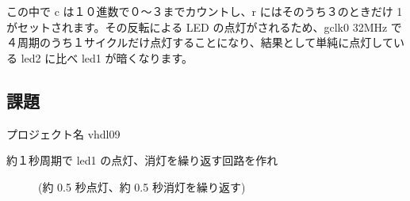 \documentclass[letterpaper,10pt,dvipdfmx]{sphinxmanual}
\begin{document}
この中で c は１０進数で０～３までカウントし、r にはそのうち３のときだけ \textquotesingle{}1\textquotesingle{} がセットされます。その反転による LED の点灯がされるため、gclk0 32MHz で４周期のうち１サイクルだけ点灯することになり、結果として単純に点灯している led2 に比べ led1 が暗くなります。

\begin{figure}[htbp]
\centering

\noindent{}
\end{figure}


\subsection{課題}
\label{\detokenize{05_try:id17}}
プロジェクト名 vhdl09
\begin{description}
\item[{約１秒周期で led1 の点灯、消灯を繰り返す回路を作れ}] \leavevmode
(約 0.5 秒点灯、約 0.5 秒消灯を繰り返す)

\end{description}
\end{document}
